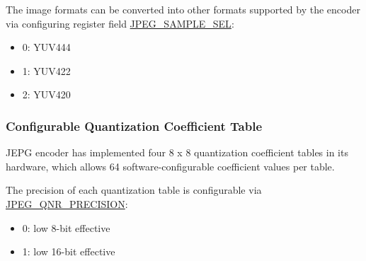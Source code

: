 \documentclass[main\_\_EN.tex]{subfiles}
\begin{document}
\begin{table}[H]
\begin{threeparttable}
    \begin{tablenotes}
        \item[1] The image formats can be converted into other formats supported by the encoder via configuring register field \hyperref[fielddesc:JPEGSAMPLESEL]{JPEG\_SAMPLE\_SEL}:
        \begin{itemize}
            \item 0: YUV444
            \item 1: YUV422
            \item 2: YUV420
        \end{itemize}
    \end{tablenotes}

    \end{threeparttable}
\end{table}


\subsubsection{Configurable Quantization Coefficient Table}
\label{sec:jpegcodec-enc-qnr}

\chipname{} JEPG encoder has implemented four 8 x 8 quantization coefficient tables in its hardware, which allows 64 software-configurable coefficient values per table.

The precision of each quantization table is configurable via \hyperref[fielddesc:JPEGQNRPRECISION]{JPEG\_QNR\_PRECISION}:
\begin{itemize}
    \item 0: low 8-bit effective
    \item 1: low 16-bit effective
\end{itemize}
\end{document}
